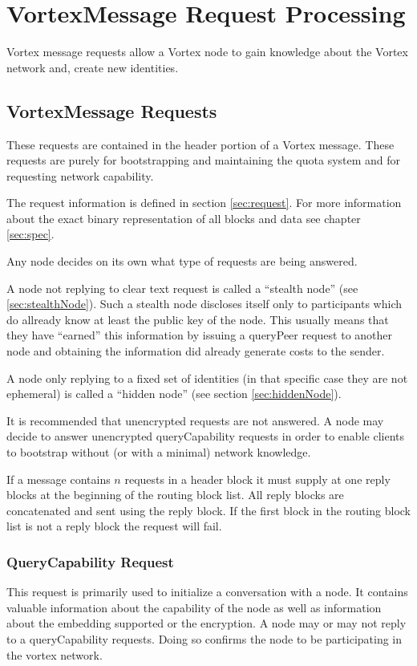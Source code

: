 \section{VortexMessage Request Processing}
Vortex message requests allow a Vortex node to gain knowledge about the Vortex network and, create new identities.


\subsection{VortexMessage Requests}
These requests are contained in the header portion of a Vortex message. These requests are purely for bootstrapping and maintaining the quota system and for requesting network capability.

The request information is defined in section \ref{sec:request}. For more information about the exact binary representation of all blocks and data see chapter \ref{sec:spec}.

Any node decides on its own what type of requests are being answered. 

A node not replying to clear text request is called a ``stealth node'' (see \ref{sec:stealthNode}). Such a stealth node discloses itself only to participants which do allready know at least the public key of the node. This usually means that they have ``earned'' this information by issuing a queryPeer request to another node and obtaining the information did already generate costs to the sender.

A node only replying to a fixed set of identities (in that specific case they are not ephemeral) is called a ``hidden node'' (see section \ref{sec:hiddenNode}).

It is recommended that unencrypted requests are not answered. A node may decide to answer unencrypted queryCapability requests in order to enable clients to bootstrap without (or with a minimal) network knowledge.

If a message contains $n$ requests in a header block it must supply at one reply blocks at the beginning of the routing block list. All reply blocks are concatenated and sent using the reply block. If the first block in the routing block list is not a reply block the request will fail.

\subsubsection{QueryCapability Request}
This request is primarily used to initialize a conversation with a node. It contains valuable information about the capability of the node as well as information about the embedding supported or the encryption. A node may or may not reply to a queryCapability requests. Doing so confirms the node to be participating in the vortex network.

